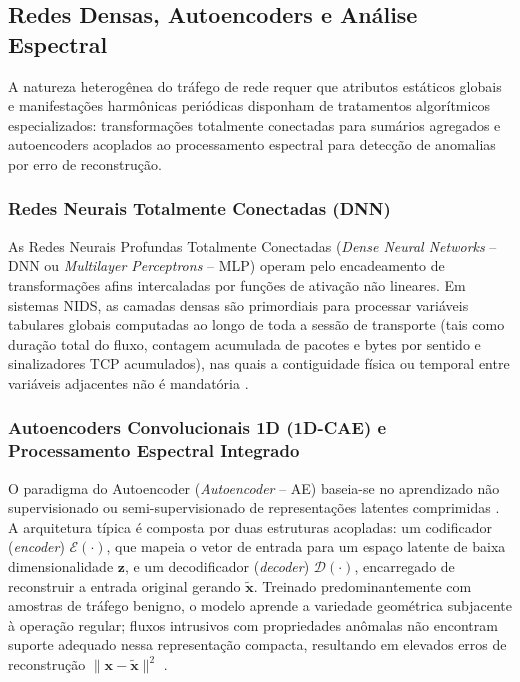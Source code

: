 \subsection{Redes Densas, Autoencoders e Análise Espectral}
\label{subsec:cae_dnns}

A natureza heterogênea do tráfego de rede requer que atributos estáticos globais e manifestações harmônicas periódicas disponham de tratamentos algorítmicos especializados: transformações totalmente conectadas para sumários agregados e autoencoders acoplados ao processamento espectral para detecção de anomalias por erro de reconstrução.

\subsubsection{Redes Neurais Totalmente Conectadas (DNN)}

As Redes Neurais Profundas Totalmente Conectadas (\emph{Dense Neural Networks} -- DNN ou \emph{Multilayer Perceptrons} -- MLP) operam pelo encadeamento de transformações afins intercaladas por funções de ativação não lineares. Em sistemas NIDS, as camadas densas são primordiais para processar variáveis tabulares globais computadas ao longo de toda a sessão de transporte (tais como duração total do fluxo, contagem acumulada de pacotes e bytes por sentido e sinalizadores TCP acumulados), nas quais a contiguidade física ou temporal entre variáveis adjacentes não é mandatória \cite{advancedids2024}.

\subsubsection{Autoencoders Convolucionais 1D (1D-CAE) e Processamento Espectral Integrado}

O paradigma do Autoencoder (\emph{Autoencoder} -- AE) baseia-se no aprendizado não supervisionado ou semi-supervisionado de representações latentes comprimidas \cite{hsae2025}. A arquitetura típica é composta por duas estruturas acopladas: um codificador (\emph{encoder}) $\mathcal{E}(\cdot)$, que mapeia o vetor de entrada para um espaço latente de baixa dimensionalidade $\mathbf{z}$, e um decodificador (\emph{decoder}) $\mathcal{D}(\cdot)$, encarregado de reconstruir a entrada original gerando $\tilde{\mathbf{x}}$. Treinado predominantemente com amostras de tráfego benigno, o modelo aprende a variedade geométrica subjacente à operação regular; fluxos intrusivos com propriedades anômalas não encontram suporte adequado nessa representação compacta, resultando em elevados erros de reconstrução $\|\mathbf{x} - \tilde{\mathbf{x}}\|^2$ \cite{hsae2025, borgioli2024cae}.

